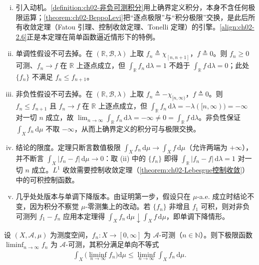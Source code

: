 \documentclass[../../main.tex]{subfiles}%
\begin{document}
\begin{remark}\label{remark:ch02-BeppoLevi动机}
\begin{enumerate}[(i)]
\item 引入动机。\cref{definition:ch02-非负可测积分}用上确界定义积分，本身不含任何极限运算；\cref{theorem:ch02-BeppoLevi}把“逐点极限”与“积分极限”交换，是此后所有收敛定理（Fatou 引理、控制收敛定理、Tonelli 定理）的引擎。\eqref{align:ch02-2.6}正是本定理在简单函数逼近情形下的特例。
\item 单调性假设不可去掉。在 $(\mathbb R,\mathscr B,\lambda)$ 上取 $f_n\triangleq\chi_{[n,n+1]}$，$f\triangleq0$。则 $f_n\geqslant0$ 可测、$f_n\to f$ 在 $\mathbb R$ 上逐点成立，但 $\int_{\mathbb R}f_n\,\mathrm{d}\lambda=1$ 不趋于 $\int_{\mathbb R}f\,\mathrm{d}\lambda=0$；此处 $\{f_n\}$ 不满足 $f_n\leqslant f_{n+1}$。
\item 非负性假设不可去掉。在 $(\mathbb R,\mathscr B,\lambda)$ 上取 $f_n\triangleq-\chi_{[n,\infty)}$，$f\triangleq0$。则 $f_n\leqslant f_{n+1}$ 且 $f_n\to f$ 在 $\mathbb R$ 上逐点成立，但 $\int_{\mathbb R}f_n\,\mathrm{d}\lambda=-\lambda([n,\infty))=-\infty$ 对一切 $n$ 成立，故 $\lim_{n\to\infty}\int_{\mathbb R}f_n\,\mathrm{d}\lambda=-\infty\neq0=\int_{\mathbb R}f\,\mathrm{d}\lambda$。非负性保证 $\int_Xf_n\,\mathrm{d}\mu$ 不取 $-\infty$，从而上确界定义的积分可与极限交换。
\item 结论的限度。定理只断言数值极限 $\int_Xf_n\,\mathrm{d}\mu\to\int_Xf\,\mathrm{d}\mu$（允许两端为 $+\infty$），并不断言 $\int_X|f_n-f|\,\mathrm{d}\mu\to0$：取 (ii) 中的 $\{f_n\}$ 即得 $\int_{\mathbb R}|f_n-f|\,\mathrm{d}\lambda=1$ 对一切 $n$ 成立。$L^1$ 收敛需要控制收敛定理（\cref{theorem:ch02-Lebesgue控制收敛}）中的可积控制函数。
\item 几乎处处版本与单调下降版本。由证明第一步，假设只在 $\mu$-a.e. 成立时结论不变，因为积分不察觉 $\mu$-零测集上的改动。若 $\{f_n\}$ 非增且 $f_1$ 可积，则对非负可测列 $f_1-f_n$ 应用本定理得 $\int_Xf_n\,\mathrm{d}\mu\downarrow\int_Xf\,\mathrm{d}\mu$，即单调下降情形。
\end{enumerate}
\end{remark}

\begin{theorem}[Fatou]\label{theorem:ch02-Fatou}
设 $(X,\mathscr A,\mu)$ 为测度空间，$f_n:X\to[0,\infty]$ 为 $\mathscr A$-可测（$n\in\mathbb N$）。则下极限函数 $\liminf_{n\to\infty}f_n$ 为 $\mathscr A$-可测，其积分满足单向不等式
\begin{align*}
\int_X\Big(\liminf_{n\to\infty}f_n\Big)\mathrm{d}\mu\leqslant\liminf_{n\to\infty}\int_Xf_n\,\mathrm{d}\mu.
\end{align*}
\end{theorem}
\end{document}
